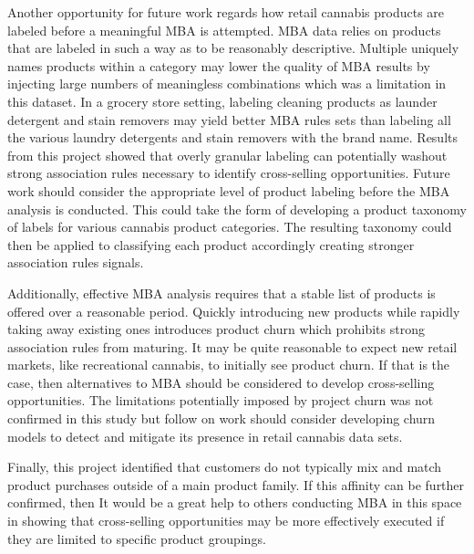 \documentclass[../article.tex, 12pt]{subfiles}
\begin{document}
\begin{multicols*}{2}
\par
Another opportunity for future work regards how retail cannabis products are labeled before a meaningful MBA is attempted. MBA data relies on products that are labeled in such a way as to be reasonably descriptive. Multiple uniquely names products within a category may lower the quality of MBA results by injecting large numbers of meaningless combinations which was a limitation in this dataset. In a grocery store setting, labeling cleaning products as launder detergent and stain removers may yield better MBA rules sets than labeling all the various laundry detergents and stain removers with the brand name. Results from this project showed that overly granular labeling can potentially washout strong association rules necessary to identify cross-selling opportunities. Future work should consider the appropriate level of product labeling before the MBA analysis is conducted. This could take the form of developing a product taxonomy of labels for various cannabis product categories. The resulting taxonomy could then be applied to classifying each product accordingly creating stronger association rules signals.

\par
Additionally, effective MBA analysis requires that a stable list of products is offered over a reasonable period. Quickly introducing new products while rapidly taking away existing ones introduces product churn which prohibits strong association rules from maturing. It may be quite reasonable to expect new retail markets, like recreational cannabis, to initially see product churn. If that is the case, then alternatives to MBA should be considered to develop cross-selling opportunities. The limitations potentially imposed by project churn was not confirmed in this study but follow on work should consider developing churn models to detect and mitigate its presence in retail cannabis data sets.

\par
Finally, this project identified that customers do not typically mix and match product purchases outside of a main product family. If this affinity can be further confirmed, then It would be a great help to others conducting MBA in this space in showing that cross-selling opportunities may be more effectively executed if they are limited to specific product groupings.

\nocite{*}


\end{multicols*}
\thispagestyle{regular}
\end{document}
